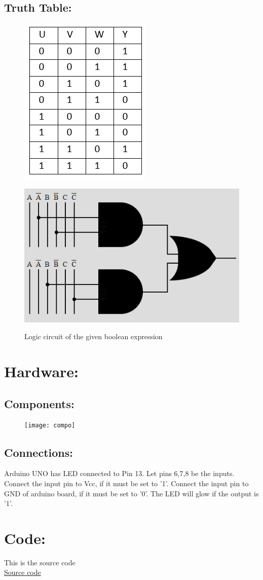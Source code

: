 \documentclass[a4paper,12pt,twocolumn]{article}
\begin{document}
\subsection{Truth Table:}
\begin{figure}[h]
\centering
\includegraphics[width=0.4\columnwidth]{ttable}
\end{figure}
\begin{figure}[h]
\centering
\includegraphics[width=0.5\columnwidth]{lc}
\label{Logic Circuit}
\caption{Logic circuit of the given boolean expression}
\end{figure}
\section{Hardware:}
\subsection{Components:}
\begin{figure}[h]
\centering
\texttt{[image: compo]}
\end{figure}
\subsection{Connections:}
Arduino UNO has LED connected to Pin 13. Let pins 6,7,8 be the inputs. Connect the input pin to Vcc, if it must be set to '1'. Connect the input pin to GND of arduino board, if it must be set to '0'. The LED will glow if the output is '1'.
\section{Code:}
This is the source code\\
\href{https://github.com/ShreyaniReddy/IITH-FWC/blob/main/avr-gcc/boolean.c}{Source code}
\end{document}
